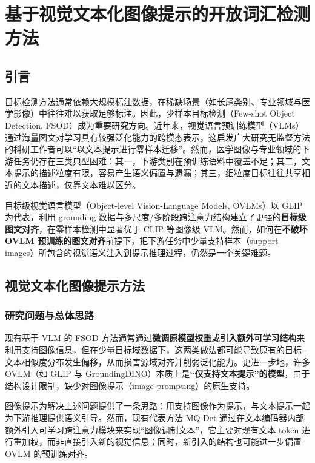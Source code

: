 \chapter{基于视觉文本化图像提示的开放词汇检测方法}

\section{引言}
目标检测方法通常依赖大规模标注数据\cite{redmon2016you,ren2016faster}，在稀缺场景（如长尾类别、专业领域与医学影像）中往往难以获取足够标注。因此，少样本目标检测（Few-shot Object Detection, FSOD）\cite{wang2019metadet,Qiao_2021_defrcn2}成为重要研究方向。近年来，视觉语言预训练模型（VLMs）通过海量图文对学习具有较强泛化能力的跨模态表示，这启发广大研究无监督方法的科研工作者可以“以文本提示进行零样本迁移”。然而，医学图像与专业领域的下游任务仍存在三类典型困难：其一，下游类别在预训练语料中覆盖不足；其二，文本提示的描述粒度有限，容易产生语义偏置与遗漏；其三，细粒度目标往往共享相近的文本描述，仅靠文本难以区分\cite{xu2023mqdet,du2022learning}。

目标级视觉语言模型（Object-level Vision-Language Models, OVLMs）\cite{li2022glip,dou2022fiber,liu2023groundingdino,minderer2022owlvit,ma2022hierkd}以 GLIP\cite{li2022glip} 为代表，利用 grounding 数据与多尺度/多阶段跨注意力结构建立了更强的\textbf{目标级图文对齐}，在零样本检测中显著优于 CLIP\cite{radford2021clip} 等图像级 VLM。然而，如何在\textbf{不破坏 OVLM 预训练的图文对齐}前提下，把下游任务中少量支持样本（support images）所包含的视觉语义注入到提示推理过程，仍然是一个关键难题。

\section{视觉文本化图像提示方法}
\subsection{研究问题与总体思路}
现有基于 VLM 的 FSOD 方法通常通过\textbf{微调原模型权重}或\textbf{引入额外可学习结构}来利用支持图像信息，但在少量目标域数据下，这两类做法都可能导致原有的目标--文本相似度分布发生偏移，从而损害源域对齐并削弱泛化能力。更进一步地，许多 OVLM（如 GLIP 与 GroundingDINO）本质上是\textbf{“仅支持文本提示”的模型}，由于结构设计限制，缺少对图像提示（image prompting）的原生支持\cite{li2022glip,liu2023groundingdino}。

图像提示为解决上述问题提供了一条思路：用支持图像作为提示，与文本提示一起为下游推理提供语义引导\cite{luddecke2022clipseg,xu2023mqdet}。然而，现有代表方法 MQ-Det\cite{xu2023mqdet} 通过在文本编码器内部额外引入可学习跨注意力模块来实现“图像调制文本”，它主要对现有文本 token 进行重加权，而非直接引入新的视觉信息；同时，新引入的结构也可能进一步偏置 OVLM 的预训练对齐。

